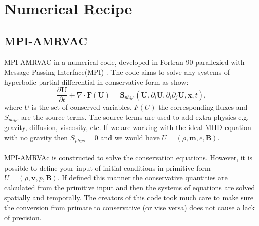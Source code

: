 \documentclass[12pt]{ociamthesis}
\begin{document}
\section{Numerical Recipe}
\label{section:numerical_recipe}
\subsection{MPI-AMRVAC}
MPI-AMRVAC in a numerical code, developed in Fortran 90 parallezied with Message Passing Interface(MPI) \citep{Keppens_2012}. The code aims to solve any systems of hyperbolic partial differential in conservative form as show: 
\begin{equation}\label{AMRVAC_stlye}
\frac{\partial \boldsymbol{U}}{\partial t} + \nabla \cdot \boldsymbol{F}(\boldsymbol{U}) = \boldsymbol{S}_{phys} (\boldsymbol{U}, \partial_{i} \boldsymbol{U}, \partial_i \partial_j \boldsymbol{U},\boldsymbol{x},t) ,
\end{equation}
where $U$ is the set of conserved variables, $F(U)$ the corresponding fluxes and $S_{phys}$ are the source terms. The source terms are used to add extra physics e.g. gravity, diffusion, viscosity, etc. If we are working with the ideal MHD equation with no gravity then $S_{phys} = $0 and we would have $U=(\rho, \boldsymbol{m}, e, \boldsymbol{B})$. \\ \\ MPI-AMRVAc is constructed to solve the conservation equations. However, it is possible to define your input of initial conditions in primitive form $U = (\rho, \boldsymbol{v}, p, \boldsymbol{B})$. If defined this manner the conservative quantities are calculated from the primitive input and then the systems of equations are solved spatially and temporally. The creators of this code took much care to make sure the conversion from primate to conservative (or vise versa) does not cause a lack of precision. \\ \\      
\end{document}
